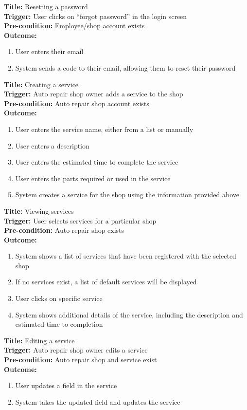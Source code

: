 \documentclass[12pt]{article}
\begin{document}
\textbf{Title:} Resetting a password\\
\textbf{Trigger:} User clicks on ``forgot password'' in the login screen\\
\textbf{Pre-condition:} Employee/shop account exists\\
\textbf{Outcome:}
\begin{enumerate}
	\item User enters their email
	\item System sends a code to their email, allowing them to reset their password
\end{enumerate}

\textbf{Title:} Creating a service\\
\textbf{Trigger:} Auto repair shop owner adds a service to the shop\\
\textbf{Pre-condition:} Auto repair shop account exists\\
\textbf{Outcome:}
\begin{enumerate}
	\item User enters the service name, either from a list or manually
	\item User enters a description
	\item User enters the estimated time to complete the service
	\item User enters the parts required or used in the service
	\item System creates a service for the shop using the information provided above
\end{enumerate}

\textbf{Title:} Viewing services\\
\textbf{Trigger:} User selects services for a particular shop\\
\textbf{Pre-condition:} Auto repair shop exists\\
\textbf{Outcome:}
\begin{enumerate}
	\item System shows a list of services that have been registered with the selected shop
	\item If no services exist, a list of default services will be displayed
	\item User clicks on specific service
	\item System shows additional details of the service, including the description and estimated time to
	      completion
\end{enumerate}

\textbf{Title:} Editing a service\\
\textbf{Trigger:} Auto repair shop owner edits a service\\
\textbf{Pre-condition:} Auto repair shop and service exist\\
\textbf{Outcome:}
\begin{enumerate}
	\item User updates a field in the service
	\item System takes the updated field and updates the service
\end{enumerate}
\end{document}
